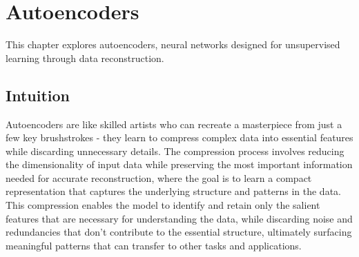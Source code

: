 
\chapter{Autoencoders}
\label{chap:autoencoders}

This chapter explores autoencoders, neural networks designed for unsupervised learning through data reconstruction.


\begin{learningobjectives}
\end{learningobjectives}



\section*{Intuition}

Autoencoders are like skilled artists who can recreate a masterpiece from just a few key brushstrokes - they learn to compress complex data into essential features while discarding unnecessary details. The compression process involves reducing the dimensionality of input data while preserving the most important information needed for accurate reconstruction, where the goal is to learn a compact representation that captures the underlying structure and patterns in the data. This compression enables the model to identify and retain only the salient features that are necessary for understanding the data, while discarding noise and redundancies that don't contribute to the essential structure, ultimately surfacing meaningful patterns that can transfer to other tasks and applications.











